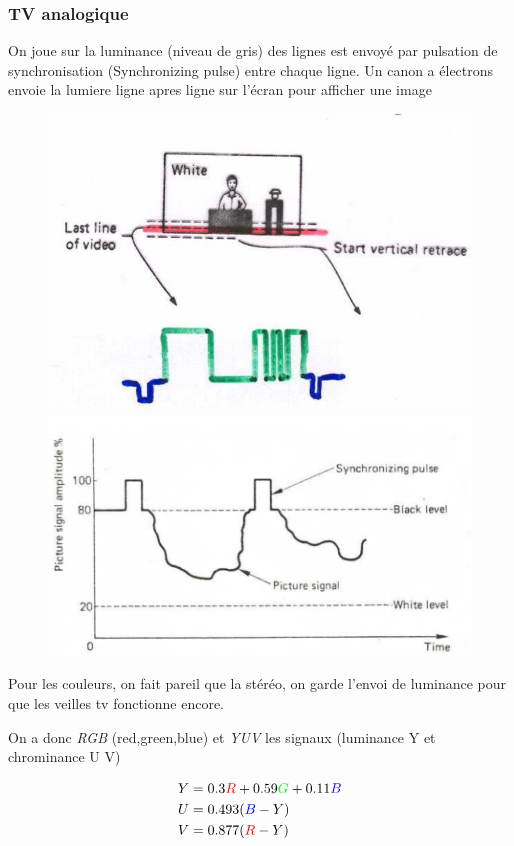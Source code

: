 		\subsubsection{TV analogique}
		
			On joue sur la luminance (niveau de gris) des lignes est envoyé par pulsation de synchronisation (Synchronizing pulse) entre chaque ligne.
			Un canon a électrons envoie la lumiere ligne apres ligne sur l'écran pour afficher une image
			
\begin{figure}
\centering
\begin{minipage}{.5\textwidth}
  \centering
  \includegraphics[width=.5\textwidth]{img/TV1.png}
\end{minipage}%
\begin{minipage}{.5\textwidth}
  \centering
  \includegraphics[width=.5\textwidth]{img/TV2.png}
\end{minipage}
\end{figure}
			
			Pour les couleurs, on fait pareil que la stéréo, on garde l'envoi de luminance pour que les veilles tv fonctionne encore.
			
			On a donc \textit{RGB} (red,green,blue) et \textit{YUV} les signaux (luminance Y et chrominance U V)
			
			\begin{align*} 
				Y &= 0.3\textcolor{red}{R} + 0.59\textcolor{green}{G} + 0.11\textcolor{blue}{B}\\
				U &= 0.493(\textcolor{blue}{B}-Y)\\
				V &= 0.877(\textcolor{red}{R}-Y)
			\end{align*}
